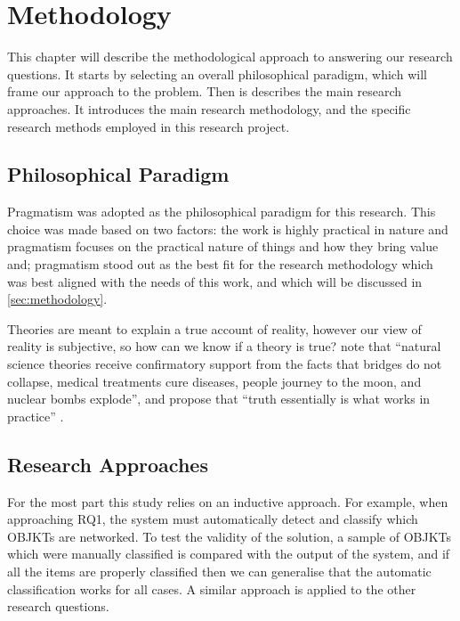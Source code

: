 \chapter{Methodology}
\label{chap:method}

This chapter will describe the methodological approach to answering our research questions.
It starts by selecting an overall philosophical paradigm, which will frame our approach to the problem. Then is describes the main research approaches. It introduces the main research methodology, and the specific research methods employed in this research project. 

\section{Philosophical Paradigm}

Pragmatism was adopted as the philosophical paradigm for this research. This choice was made based on two factors: the work is highly practical in nature and pragmatism focuses on the practical nature of things and how they bring value and; pragmatism stood out as the best fit for the research methodology which was best aligned with the needs of this work, and which will be discussed in \autoref{sec:methodology}.

Theories are meant to explain a true account of reality, however our view of reality is subjective, so how can we know if a theory is true? \citeauthor{marchDesignNaturalScience1995} note that ``natural science theories receive confirmatory support from the facts that bridges do not collapse, medical treatments cure diseases, people journey to the moon, and nuclear bombs explode'', and propose that ``truth essentially is what works in practice'' \citeyear[p.255]{marchDesignNaturalScience1995}.


\section{Research Approaches}

For the most part this study relies on an inductive approach. For example, when approaching RQ1, the system must automatically detect and classify which OBJKTs are networked. To test the validity of the solution, a sample of OBJKTs which were manually classified is compared with the output of the system, and if all the items are properly classified then we can generalise that the automatic classification works for all cases.
A similar approach is applied to the other research questions.


